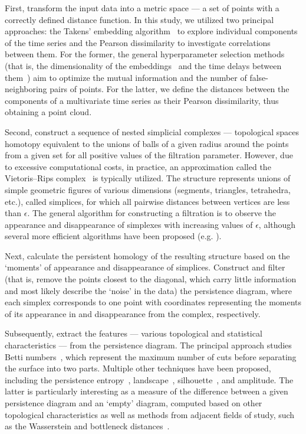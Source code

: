 \documentclass[pdflatex,sn-basic,Numbered]{sn-jnl}
\begin{document}
First, transform the input data into a metric space --- a set of points with a correctly defined distance function. In this study, we utilized two principal approaches: the Takens' embedding algorithm~\cite{10.1007/BFb0091924,perea2013slidingwindowspersistenceapplication} to explore individual components of the time series and the Pearson dissimilarity to investigate correlations between them. For the former, the general hyperparameter selection methods (that is, the dimensionality of the embeddings~\cite{PhysRevA.45.3403} and the time delays between them~\cite{PhysRevA.33.1134}) aim to optimize the mutual information and the number of false-neighboring pairs of points. For the latter, we define the distances between the components of a multivariate time series as their Pearson dissimilarity, thus obtaining a point cloud.

Second, construct a sequence of nested simplicial complexes --- topological spaces homotopy equivalent to the unions of balls of a given radius around the points from a given set for all positive values of the filtration parameter. However, due to excessive computational costs, in practice, an approximation called the Vietoris--Rips complex~\cite{Vietoris1927} is typically utilized. The structure represents unions of simple geometric figures of various dimensions (segments, triangles, tetrahedra, etc.), called simplices, for which all pairwise distances between vertices are less than $\epsilon$. The general algorithm for constructing a filtration is to observe the appearance and disappearance of simplexes with increasing values of $\epsilon$, although several more efficient algorithms have been proposed (e.g. \cite{Bauer_2021}).

Next, calculate the persistent homology of the resulting structure based on the `moments' of appearance and disappearance of simplices. Construct and filter (that is, remove the points closest to the diagonal, which carry little information and most likely describe the `noise' in the data) the persistence diagram, where each simplex corresponds to one point with coordinates representing the moments of its appearance in and disappearance from the complex, respectively.

Subsequently, extract the features --- various topological and statistical characteristics --- from the persistence diagram. The principal approach studies Betti numbers~\cite{Zomorodian2005}, which represent the maximum number of cuts before separating the surface into two parts. Multiple other techniques have been proposed, including the persistence entropy~\cite{10.1007/978-3-319-29228-1_11}, landscape~\cite{bubenik2015statisticaltopologicaldataanalysis}, silhouette~\cite{chazal2013stochasticconvergencepersistencelandscapes}, and amplitude. The latter is particularly interesting as a measure of the difference between a given persistence diagram and an `empty' diagram, computed based on other topological characteristics as well as methods from adjacent fields of study, such as the Wasserstein and bottleneck distances~\cite{Efrat2001}.
\end{document}
